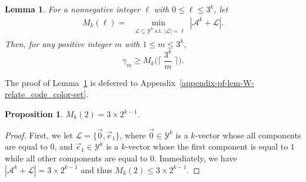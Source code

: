 \documentclass[11pt,draftclsnofoot,onecolumn]{IEEEtran}
\newtheorem{lemma}{Lemma}
\newtheorem{prop}{Proposition}
\begin{document}
\begin{journalonly}
{\begin{lemma}\label{lemma:pf-W-relat_code_color_set}
For a nonnegative integer $\ell$ with  $0\leq \ell  \leq 3^{k}$, let
\begin{align}
	M_{k}(\ell)=\min_{\substack{\;\;\mathcal{L}\subseteq\mathcal{Y}^{k}\;\text{s.t.}\;|\mathcal{L}|=\ell}}|\mathcal{A}^{k}+ \mathcal{L}|.\label{def:M_k(l)}
	\end{align}
Then, for any positive integer $m$ with $1\leq m\leq 3^{k}$,
\begin{equation}
		\gamma_{m}\geq M_
		{k}\Big(\Big\lceil\;\frac{3^{k}}{m}\;\Big\rceil\Big).\label{eq:pf-W-lemma:relat_code_color_set}
	\end{equation}
\end{lemma}

The proof of Lemma~\ref{lemma:pf-W-relat_code_color_set} is deferred to Appendix~\ref{appendix-pf-lem-W-relate_code_color-set}.

\begin{prop}\label{lemma:M_k(2)} $M_{k}(2)=3\times 2^{k-1}$.
\end{prop}
\begin{proof}
First, we let $\mathcal{L}=\{\vec{0},\vec{e}_{1}\}$, where $\vec{0}\in\mathcal{Y}^{k}$ is  a $k$-vector whose all components are equal to $0$, and  $\vec{e}_{1}\in\mathcal{Y}^{k}$ is a $k$-vector whose the first component is equal to $1$ while all other components are equal to $0$. Immediately, we have $|\mathcal{A}^{k}+\mathcal{L}|=3\times 2^{k-1}$ and thus $M_{k}(2)\leq 3\times 2^{k-1}.$


\end{proof}}
\end{journalonly}
\end{document}
